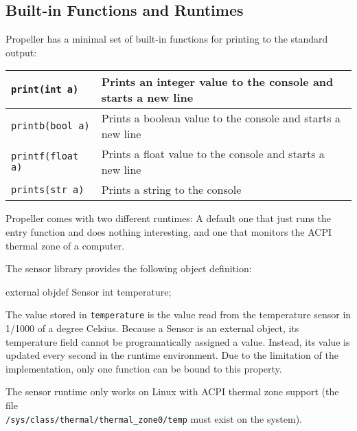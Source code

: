 \subsection{Built-in Functions and Runtimes}

Propeller has a minimal set of built-in functions for printing to the standard output:

\begin{tabular}{|l|l|}
\hline
\verb|print(int a)| & Prints an integer value to the console and starts a new line \\\hline
\verb|printb(bool a)| & Prints a boolean value to the console and starts a new line \\\hline
\verb|printf(float a)| & Prints a float value to the console and starts a new line \\\hline
\verb|prints(str a)| & Prints a string to the console\\
\hline
\end{tabular}

Propeller comes with two different runtimes: A default one that just runs the entry function
and does nothing interesting, and one that monitors the ACPI thermal zone of a computer.

The sensor library provides the following object definition:

\begin{mylisting}
external objdef Sensor
{
  int temperature;
}
\end{mylisting}

The value stored in \verb|temperature| is the value read from the temperature sensor in
1/1000 of a degree Celsius. Because a Sensor is an external object, its temperature
field cannot be programatically assigned a value. Instead, its value is updated every second
in the runtime environment. Due to the limitation of the implementation, only one function
can be bound to this property.

The sensor runtime only works on Linux with ACPI thermal zone support (the file \\
\texttt{/sys/class/thermal/thermal\_zone0/temp} must exist on the system).
